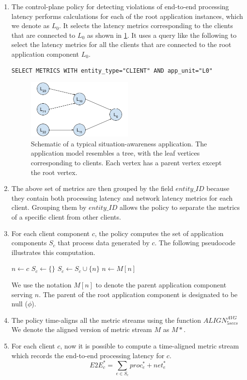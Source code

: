\begin{enumerate}
\item The control-plane policy for detecting violations of end-to-end processing latency performs calculations for each of the root application instances, which we denote as $L_0$. It selects the latency metrics corresponding to the clients that are connected to $L_0$ as shown in \cref{fig:app_pipeline}. It uses a query like the following to select the latency metrics for all the clients that are connected to the root application component $L_0$.
\begin{verbatim}
SELECT METRICS WITH entity_type="CLIENT" AND app_unit="L0"
\end{verbatim}
\begin{figure}
\centering
\includegraphics[width=0.5\textwidth]{figures/mechanisms/monitoring/app_pipeline.png}
\caption{Schematic of a typical situation-awareness application. The application model resembles a tree, with the leaf vertices corresponding to clients. Each vertex has a parent vertex except the root vertex.}
\label{fig:app_pipeline}
\end{figure}
\item The above set of metrics are then grouped by the field $entity\_ID$ because they contain both processing latency and network latency metrics for each client. Grouping them by $entity\_ID$ allows the policy to separate the metrics of a specific client from other clients.
\item For each client component $c$, the policy computes the set of application components $S_c$ that process data generated by $c$. The following pseudocode illustrates this computation.
\begin{algorithmic}
\State $n \gets c$
\State $S_c \gets \{\}$
    \State $S_c \gets S_c \cup \{ n \}$
    \State $n \gets M \left[ n \right]$
\EndWhile
\end{algorithmic}
We use the notation $M \left[ n \right]$ to denote the parent application component serving $n$. The parent of the root application component is designated to be null ($\phi$).

\item The policy time-aligns all the metric streams using the function $ALIGN^{AVG}_{5secs}$ We denote the aligned version of metric stream $M$ as $M*$.

\item For each client $c$, now it is possible to compute a time-aligned metric stream which records the end-to-end processing latency for $c$.
\begin{equation}
E2E_c^* = \sum_{e \in S_c} proc_e^* + net_e^*
\end{equation}

\end{enumerate}

